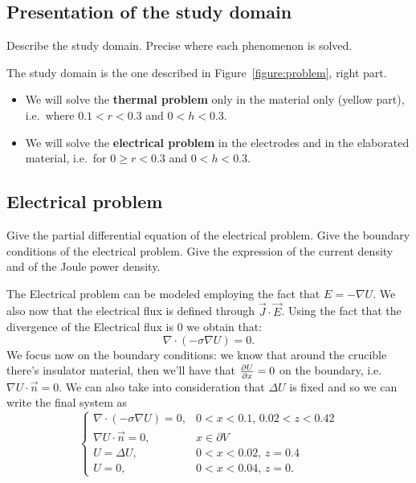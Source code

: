\subsection{Presentation of the study domain}
Describe the study domain. Precise where each phenomenon is solved.
\begin{mdframed}
	The study domain is the one described in Figure~\ref{figure:problem}, right part. 
	\begin{itemize}
		\item We will solve the \textbf{thermal problem} only in the material only (yellow part), i.e.~where $ 0.1<r<0.3 $ and $ 0<h<0.3 $.
		\item We will solve the \textbf{electrical problem} in the electrodes and in the elaborated material, i.e.~for $ 0\geq r<0.3 $ and $ 0<h<0.3 $.  
	\end{itemize} 
\end{mdframed}
\subsection{Electrical problem}
Give the partial differential equation of the electrical problem.
Give the boundary conditions of the electrical problem.
Give the expression of the current density and of the Joule power density.
\begin{mdframed}
	The Electrical problem can be modeled employing the fact that $ E=-\nabla U $. We also now that the electrical flux is defined through $ \vec{J}\cdot \vec{E} $. Using the fact that the divergence of the Electrical flux is 0 we obtain that:
	\[ \nabla\cdot(-\sigma\nabla U)=0. \]
	We focus now on the boundary conditions: we know that around the crucible there's insulator material, then we'll have that $ \frac{\partial U}{\partial x}=0 $ on the boundary, i.e. $ \nabla U\cdot \vec{n}=0 $. We can also take into consideration that $ \Delta U $ is fixed and so we can write the final system as
	\[
	\begin{cases}
	\nabla\cdot(-\sigma\nabla U)=0, & 0<x<0.1,\,0.02<z<0.42\\
	\nabla U\cdot \vec{n}=0,& x\in \partial V\\
	U = \Delta U, & 0<x<0.02,\,z=0.4\\
	U=0, & 0<x<0.04,\,z=0.
	\end{cases}
	\]
\end{mdframed}

